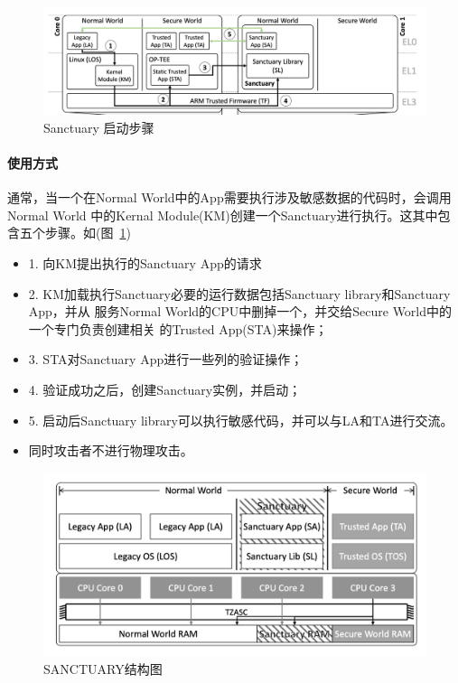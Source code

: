 \begin{figure}
    \centering
    \includegraphics[scale=0.35]{Figures/trustzone/step.png}
    \decoRule
    \caption{Sanctuary 启动步骤}
    \label{fig:step}
\end{figure}

\paragraph{使用方式}
通常，当一个在Normal World中的App需要执行涉及敏感数据的代码时，会调用Normal World
中的Kernal Module(KM)创建一个Sanctuary进行执行。这其中包含五个步骤。如(图~\ref{fig:step})
\begin{itemize}
    \item
    1. 向KM提出执行的Sanctuary App的请求
    \item
    2. KM加载执行Sanctuary必要的运行数据包括Sanctuary library和Sanctuary App，并从
    服务Normal World的CPU中删掉一个，并交给Secure World中的一个专门负责创建相关
    的Trusted App(STA)来操作；
    \item 
    3. STA对Sanctuary App进行一些列的验证操作；
    \item
    4. 验证成功之后，创建Sanctuary实例，并启动；
    \item
    5. 启动后Sanctuary library可以执行敏感代码，并可以与LA和TA进行交流。
    \item
    同时攻击者不进行物理攻击。
\end{itemize}

\begin{figure}
    \centering
    \includegraphics[scale=0.45]{Figures/trustzone/sancutary.png}
    \decoRule
    \caption{SANCTUARY结构图}
    \label{fig:sanctuary}
\end{figure}

